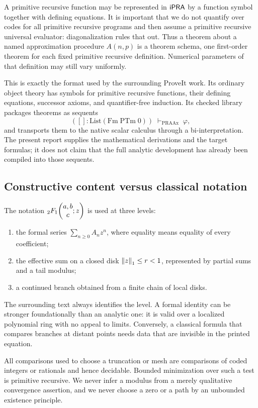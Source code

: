 A primitive recursive function may be represented in \(\mathsf{iPRA}\) by a function
symbol together with defining equations.  It is important that we do not
quantify over codes for all primitive recursive programs and then assume a
primitive recursive universal evaluator: diagonalization rules that out.
Thus a theorem about a named approximation procedure \(A(n,p)\) is a theorem
schema, one first-order theorem for each fixed primitive recursive definition.
Numerical parameters of that definition may still vary uniformly.

This is exactly the format used by the surrounding ProveIt work.  Its ordinary
object theory has symbols for primitive recursive functions, their defining
equations, successor axioms, and quantifier-free induction.  Its checked
 library packages theorems as sequents
\[
   ([]:\mathrm{List}(\mathrm{Fm}\;\mathrm{PTm}\;0))
      \;\vdash_{\mathrm{PRAAx}}\;\varphi,
\]
and transports them to the native scalar calculus through a bi-interpretation.
The present report supplies the mathematical derivations and the target
formulas; it does not claim that the full analytic development has already
been compiled into those sequents.

\subsection{Constructive content versus classical notation}

The notation \({}_2F_1\!\left(\begin{matrix}a,b\\c\end{matrix};z\right)\) is used at three levels:
\begin{enumerate}
\item the formal series \(\sum_{n\ge0}A_nz^n\), where equality means equality
of every coefficient;
\item the effective sum on a closed disk \(\left\lVert z\right\rVert_1\le r<1\), represented by
partial sums and a tail modulus;
\item a continued branch obtained from a finite chain of local disks.
\end{enumerate}
The surrounding text always identifies the level.  A formal identity can be
stronger foundationally than an analytic one: it is valid over a localized
polynomial ring with no appeal to limits.  Conversely, a classical formula
that compares branches at distant points needs data that are invisible in the
printed equation.

\begin{remark}
All comparisons used to choose a truncation or mesh are comparisons of coded
integers or rationals and hence decidable.  Bounded minimization over such a
test is primitive recursive.  We never infer a modulus from a merely
qualitative convergence assertion, and we never choose a zero or a path by an
unbounded existence principle.
\end{remark}

